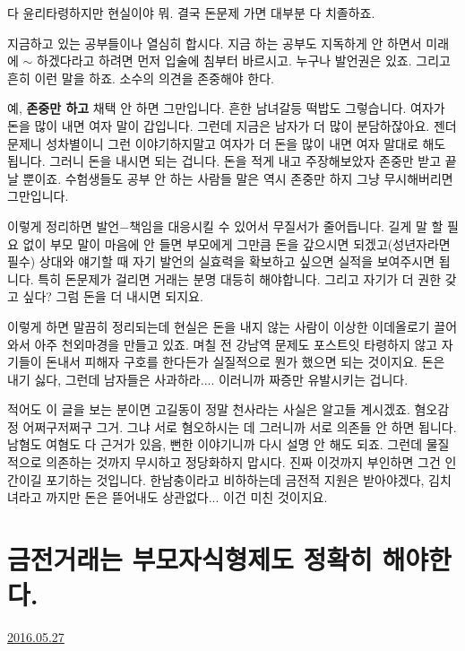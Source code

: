 다 윤리타령하지만 현실이야 뭐. 결국 돈문제 가면 대부분 다 치졸하죠.
\vspace{5mm}

지금하고 있는 공부들이나 열심히 합시다. 지금 하는 공부도 지독하게 안 하면서 미래에 $\sim$ 하겠다라고 하려면 먼저 입술에 침부터 바르시고.
누구나 발언권은 있죠.
그리고 흔히 이런 말을 하죠.
소수의 의견을 존중해야 한다.
\vspace{5mm}

예, \textbf{존중만 하고} 채택 안 하면 그만입니다.
흔한 남녀갈등 떡밥도 그렇습니다. 여자가 돈을 많이 내면 여자 말이 갑입니다. 그런데 지금은 남자가 더 많이 분담하잖아요.
젠더 문제니 성차별이니 그런 이야기하지말고 여자가 더 돈을 많이 내면 여자 말대로 해도 됩니다. 그러니 돈을 내시면 되는 겁니다.
돈을 적게 내고 주장해보았자 존중만 받고 끝날 뿐이죠.
수험생들도 공부 안 하는 사람들 말은 역시 존중만 하지 그냥 무시해버리면 그만입니다.
\vspace{5mm}

이렇게 정리하면 발언$-$책임을 대응시킬 수 있어서 무질서가 줄어듭니다.
길게 말 할 필요 없이 부모 말이 마음에 안 들면 부모에게 그만큼 돈을 갚으시면 되겠고(성년자라면 필수)
상대와 얘기할 때 자기 발언의 실효력을 확보하고 싶으면 실적을 보여주시면 됩니다.
특히 돈문제가 걸리면 거래는 분명 대등히 해야합니다. 그리고 자기가 더 권한 갖고 싶다? 그럼 돈을 더 내시면 되지요.
\vspace{5mm}

이렇게 하면 말끔히 정리되는데 현실은 돈을 내지 않는 사람이 이상한 이데올로기 끌어와서 아주 천외마경을 만들고 있죠.
며칠 전 강남역 문제도 포스트잇 타령하지 않고 자기들이 돈내서 피해자 구호를 한다든가 실질적으로 뭔가 했으면 되는 것이지요.
돈은 내기 싫다, 그런데 남자들은 사과하라.... 이러니까 짜증만 유발시키는 겁니다.
\vspace{5mm}

적어도 이 글을 보는 분이면 고길동이 정말 천사라는 사실은 알고들 계시겠죠.
혐오감정 어쩌구저쩌구 그거. 그냐 서로 혐오하시는 데 그러니까 서로 의존들 안 하면 됩니다.
남혐도 여혐도 다 근거가 있음, 뻔한 이야기니까 다시 설명 안 해도 되죠.
그런데 물질적으로 의존하는 것까지 무시하고 정당화하지 맙시다. 진짜 이것까지 부인하면 그건 인간이길 포기하는 것입니다.
한남충이라고 비하하는데 금전적 지원은 받아야겠다, 김치녀라고 까지만 돈은 뜯어내도 상관없다... 이건 미친 것이지요.
\vspace{5mm}

\section{금전거래는 부모자식형제도 정확히 해야한다.}
\href{https://www.kockoc.com/Apoc/795089}{2016.05.27}

